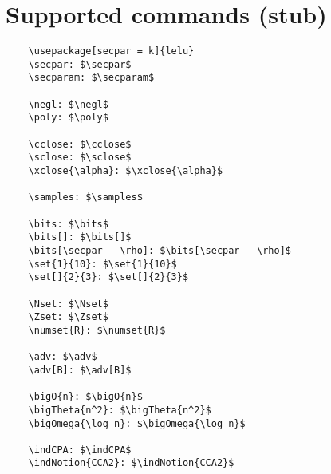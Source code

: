 \documentclass{article}
\begin{document}
\section{Supported commands (stub)}

\begin{lstlisting}
    \usepackage[secpar = k]{lelu}
    \secpar: $\secpar$
    \secparam: $\secparam$

    \negl: $\negl$
    \poly: $\poly$

    \cclose: $\cclose$
    \sclose: $\sclose$
    \xclose{\alpha}: $\xclose{\alpha}$ 

    \samples: $\samples$

    \bits: $\bits$
    \bits[]: $\bits[]$
    \bits[\secpar - \rho]: $\bits[\secpar - \rho]$
    \set{1}{10}: $\set{1}{10}$
    \set[]{2}{3}: $\set[]{2}{3}$

    \Nset: $\Nset$
    \Zset: $\Zset$
    \numset{R}: $\numset{R}$

    \adv: $\adv$
    \adv[B]: $\adv[B]$

    \bigO{n}: $\bigO{n}$
    \bigTheta{n^2}: $\bigTheta{n^2}$ 
    \bigOmega{\log n}: $\bigOmega{\log n}$ 

    \indCPA: $\indCPA$
    \indNotion{CCA2}: $\indNotion{CCA2}$

\end{lstlisting}
\end{document}
